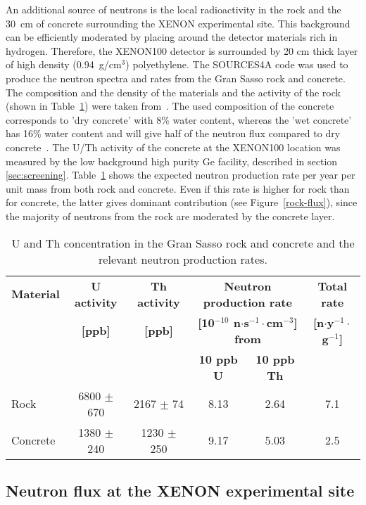 An additional source of neutrons is the local radioactivity in
the rock and the 30~cm of concrete surrounding the XENON experimental site. This background
can be efficiently moderated by placing around the
detector materials rich in hydrogen. Therefore, the XENON100 detector is surrounded by 20 cm thick layer of high density (0.94~g/cm$^3$) polyethylene.
The SOURCES4A code was used to produce the neutron
spectra and rates from the Gran Sasso rock and concrete. 
The composition and the density of the materials and the activity of the rock
(shown in Table~\ref{tab:activ-rates}) were taken from~\cite{wulandari}.
The used composition of the concrete corresponds to 'dry concrete' with 8\% water
content, whereas the 'wet concrete' has 16\% water content and will give half
of the neutron flux compared to dry concrete~\cite{wulandari}. 
The U/Th activity of the concrete at the XENON100 location was measured by the low background high purity Ge facility, described in section \ref{sec:screening}.
Table~\ref{tab:activ-rates} shows the expected neutron production rate
per year per unit mass from both rock and concrete. Even if this rate is
higher for rock than for concrete, the latter gives dominant
contribution (see Figure~\ref{rock-flux}), since the majority of neutrons from the 
rock are moderated by the concrete layer.

\begin{table}[h]
\centering
\caption{U and Th concentration in the Gran Sasso rock and concrete and the relevant
neutron production rates.}
\label{tab:activ-rates}
\vspace{0.3cm}
\begin{tabular}{lccccc}
\hline
\bf{Material} & \bf{U activity}  & \bf{Th activity}  & \multicolumn{2}{c}{\bf{Neutron production
  rate}} & \bf{Total rate}\\                      
        &     \bf{[ppb]}   & \bf{[ppb]}  &
        \multicolumn{2}{c}{\bf{[10$^{-10}$ n$\cdot$s$^{-1}\cdot$cm$^{-3}$] from}}  & \bf{[n$\cdot$y$^{-1}\cdot$g$^{-1}$]}\\ 
         &                        &    & \bf{10 ppb U} & \bf{10 ppb Th} & \\         
\hline
Rock &  6800 $\pm$ 670 &  2167 $\pm$ 74 & 8.13 & 2.64 & 7.1\\
Concrete & 1380 $\pm$ 240 & 1230 $\pm$ 250 & 9.17 & 5.03 & 2.5\\
\hline
\end{tabular}
\end{table}

\subsection{Neutron flux at the XENON experimental site} \label{sec:localflux}


